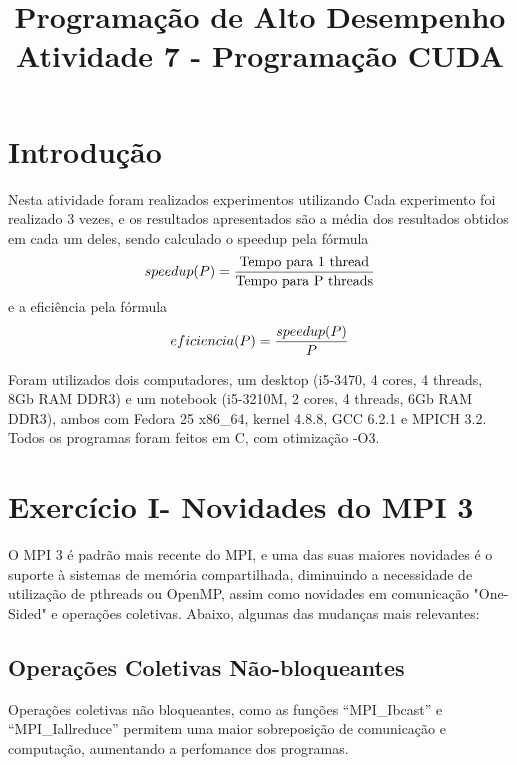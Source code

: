 \documentclass[conference]{IEEEtran}
\begin{document}
\title{Programação de Alto Desempenho\\
\large Atividade 7 - Programação CUDA}

\author{
 }

\maketitle


\section{Introdução}
Nesta atividade foram realizados experimentos utilizando 
Cada experimento foi realizado 3 vezes, e os resultados apresentados são a média dos resultados obtidos em cada um deles, sendo calculado o speedup pela fórmula $$speedup(P) = {{\textrm{Tempo para 1 thread} }\over{\textrm{Tempo para P threads} }}$$ e a eficiência pela fórmula $$eficiencia(P) = {{speedup(P)}\over{P}}$$


Foram utilizados dois computadores, um desktop (i5-3470, 4 cores, 4 threads, 8Gb RAM DDR3) e um notebook (i5-3210M, 2 cores, 4 threads, 6Gb RAM DDR3), ambos com Fedora 25 x86\_64, kernel 4.8.8, GCC 6.2.1 e MPICH 3.2. Todos os programas foram feitos em C, com otimização -O3.


\section{Exercício I- Novidades do MPI 3}

O MPI 3 é padrão mais recente do MPI, e uma das suas maiores novidades é o suporte à sistemas de memória compartilhada, diminuindo a necessidade de utilização de pthreads ou OpenMP, assim como novidades em comunicação "One-Sided" e operações coletivas. Abaixo, algumas das mudanças mais relevantes:

\subsection{Operações Coletivas Não-bloqueantes}
Operações coletivas não bloqueantes, como as funções ``MPI\_Ibcast'' e ``MPI\_Iallreduce'' permitem uma maior sobreposição de comunicação e computação, aumentando a perfomance dos programas.
\end{document}
